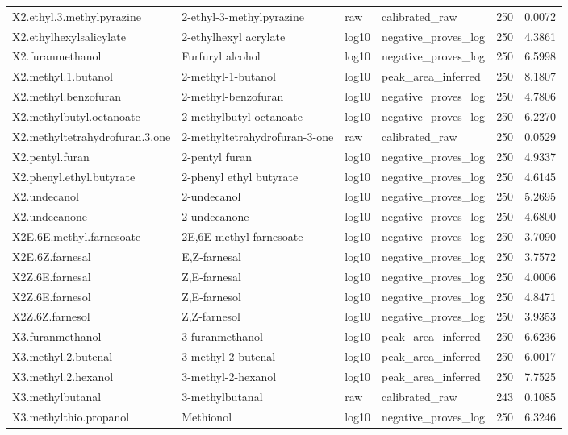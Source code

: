 {\begin{longtable}{llllrr}
X2.ethyl.3.methylpyrazine & 2-ethyl-3-methylpyrazine & raw & calibrated\_raw & 250 & 0.0072 \\
X2.ethylhexylsalicylate & 2-ethylhexyl acrylate & log10 & negative\_proves\_log & 250 & 4.3861 \\
X2.furanmethanol & Furfuryl alcohol & log10 & negative\_proves\_log & 250 & 6.5998 \\
X2.methyl.1.butanol & 2-methyl-1-butanol & log10 & peak\_area\_inferred & 250 & 8.1807 \\
X2.methyl.benzofuran & 2-methyl-benzofuran & log10 & negative\_proves\_log & 250 & 4.7806 \\
X2.methylbutyl.octanoate & 2-methylbutyl octanoate & log10 & negative\_proves\_log & 250 & 6.2270 \\
X2.methyltetrahydrofuran.3.one & 2-methyltetrahydrofuran-3-one & raw & calibrated\_raw & 250 & 0.0529 \\
X2.pentyl.furan & 2-pentyl furan & log10 & negative\_proves\_log & 250 & 4.9337 \\
X2.phenyl.ethyl.butyrate & 2-phenyl ethyl butyrate & log10 & negative\_proves\_log & 250 & 4.6145 \\
X2.undecanol & 2-undecanol & log10 & negative\_proves\_log & 250 & 5.2695 \\
X2.undecanone & 2-undecanone & log10 & negative\_proves\_log & 250 & 4.6800 \\
X2E.6E.methyl.farnesoate & 2E,6E-methyl farnesoate & log10 & negative\_proves\_log & 250 & 3.7090 \\
X2E.6Z.farnesal & E,Z-farnesal & log10 & negative\_proves\_log & 250 & 3.7572 \\
X2Z.6E.farnesal & Z,E-farnesal & log10 & negative\_proves\_log & 250 & 4.0006 \\
X2Z.6E.farnesol & Z,E-farnesol & log10 & negative\_proves\_log & 250 & 4.8471 \\
X2Z.6Z.farnesol & Z,Z-farnesol & log10 & negative\_proves\_log & 250 & 3.9353 \\
X3.furanmethanol & 3-furanmethanol & log10 & peak\_area\_inferred & 250 & 6.6236 \\
X3.methyl.2.butenal & 3-methyl-2-butenal & log10 & peak\_area\_inferred & 250 & 6.0017 \\
X3.methyl.2.hexanol & 3-methyl-2-hexanol & log10 & peak\_area\_inferred & 250 & 7.7525 \\
X3.methylbutanal & 3-methylbutanal & raw & calibrated\_raw & 243 & 0.1085 \\
X3.methylthio.propanol & Methionol & log10 & negative\_proves\_log & 250 & 6.3246 \\

\end{longtable}}
